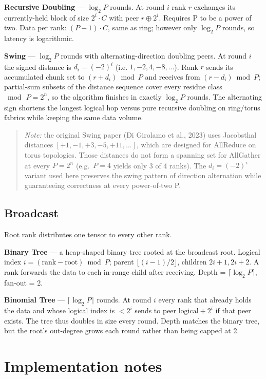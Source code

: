 \documentclass[11pt]{article}
\begin{document}
\textbf{Recursive Doubling} --- $\log_2 P$ rounds. At round $i$ rank $r$ exchanges
its currently-held block of size $2^i \cdot C$ with peer $r \oplus 2^i$. Requires
P to be a power of two. Data per rank: $(P - 1)\cdot C$, same as ring; however
only $\log_2 P$ rounds, so latency is logarithmic.

\textbf{Swing} --- $\log_2 P$ rounds with alternating-direction doubling peers.
At round $i$ the signed distance is $d_i = (-2)^i$ (i.e. $1, -2, 4, -8, \ldots$).
Rank $r$ sends its accumulated chunk set to $(r + d_i) \bmod P$ and
receives from $(r - d_i) \bmod P$; partial-sum subsets of the distance
sequence cover every residue class $\bmod\,P = 2^n$, so the algorithm finishes
in exactly $\log_2 P$ rounds. The alternating sign shortens the longest
logical hop versus pure recursive doubling on ring/torus fabrics while
keeping the same data volume.

\begin{quote}
\textit{Note:} the original Swing paper (Di Girolamo et al., 2023) uses
Jacobsthal distances $[+1, -1, +3, -5, +11, \ldots]$, which are designed
for AllReduce on torus topologies. Those distances do not form a
spanning set for AllGather at every $P = 2^n$ (e.g.\ $P = 4$ yields only
3 of 4 ranks). The $d_i = (-2)^i$ variant used here preserves the
swing pattern of direction alternation while guaranteeing correctness
at every power-of-two P.
\end{quote}

\subsection{Broadcast}

Root rank distributes one tensor to every other rank.

\textbf{Binary Tree} --- a heap-shaped binary tree rooted at the broadcast
root. Logical index $i = (\text{rank} - \text{root}) \bmod P$; parent $\lfloor (i-1)/2 \rfloor$,
children $2i+1, 2i+2$. A rank forwards the data to each in-range child
after receiving. Depth = $\lceil \log_2 P \rceil$, fan-out = 2.

\textbf{Binomial Tree} --- $\lceil \log_2 P \rceil$ rounds. At round $i$ every rank that
already holds the data and whose logical index is $< 2^i$ sends to peer
$\text{logical} + 2^i$ if that peer exists. The tree thus doubles in size
every round. Depth matches the binary tree, but the root's out-degree
grows each round rather than being capped at 2.

\section{Implementation notes}
\end{document}
